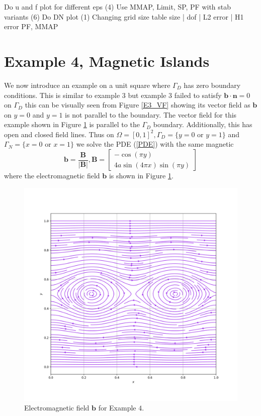 \documentclass[12pt]{ociamthesis}
\begin{document}
Do u and f plot for different eps (4)
Use MMAP, Limit, SP, PF
with stab variants (6)
Do DN plot (1)
Changing grid size table 
size | dof | L2 error | H1 error PF, MMAP

\section{Example 4, Magnetic Islands}

We now introduce an example on a unit square where $\Gamma_D$ has zero boundary conditions. This is similar to example $3$ but example $3$ failed to satisfy $\mathbf{b}\cdot\mathbf{n} = 0$ on $\Gamma_D$ this can be visually seen from Figure \ref{E3_VF} showing its vector field as $\mathbf{b}$ on $y=0$ and $y=1$ is not parallel to the boundary. The vector field for this example shown in Figure \ref{E4_VF} is parallel to the $\Gamma_D$ boundary. Additionally, this has open and closed field lines.
Thus on $\Omega = [0,1]^2, \Gamma_D = \{y=0 \text{ or } y=1\}$ and $\Gamma_N = \{x=0 \text{ or } x=1\}$ we solve the PDE (\ref{PDE}) with the same magnetic
\begin{equation}
\mathbf{b} = \frac{\mathbf{B}}{|\mathbf{B}|}, 
\mathbf{B} = \left[ \begin{matrix}
-\cos(\pi y)\\
4a \sin(4 \pi x) \sin(\pi y)
\end{matrix} \right]
\end{equation}
where the electromagnetic field $\mathbf{b}$ is shown in Figure \ref{E4_VF}.
\begin{figure}[H]
 \includegraphics[width=\textwidth]{Pics/VectorField/E4b.png}
  \caption{Electromagnetic field $\mathbf{b}$ for Example $4$.}
 \label{E4_VF}
\end{figure}
\end{document}
